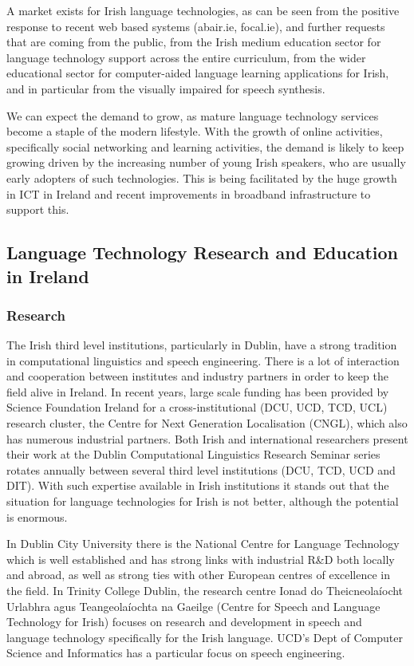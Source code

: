 \begin{multicols}{2}
A market exists for Irish language technologies, as can be seen from the positive response to recent web based systems (abair.ie, focal.ie), and further requests that are coming from the public, from the Irish medium education sector for language technology support across the entire curriculum,  from the wider educational sector for computer-aided language learning applications for Irish, and in particular from the visually impaired for speech synthesis. 

We can expect the demand to grow, as mature language technology services become a staple of the modern lifestyle. With the growth of online activities, specifically social networking and learning activities, the demand is likely to keep growing  driven by the increasing number  of young Irish speakers, who are usually early adopters of such technologies. This is being facilitated by the huge growth in ICT in Ireland and recent improvements in broadband infrastructure to support this.


\subsection{Language Technology Research and Education in Ireland}

\subsubsection{Research}

The Irish third level institutions, particularly in Dublin, have a strong tradition in computational linguistics and speech engineering. There is a lot of interaction and cooperation between institutes and industry partners in order to keep the field alive in Ireland. In recent years, large scale funding has been provided by Science Foundation Ireland for a cross-institutional (DCU, UCD, TCD, UCL) research cluster, the Centre for Next Generation Localisation (CNGL), which also has numerous industrial partners. Both Irish and international researchers present their work at the Dublin Computational Linguistics Research Seminar series rotates annually between several third level institutions (DCU, TCD, UCD and DIT). With such expertise available in Irish institutions it stands out that the situation for language technologies for Irish is not better, although the potential is enormous. 

In Dublin City University there is the National Centre for Language Technology which is well established and has strong links with industrial R\&D both locally and abroad, as well as strong ties with other European centres of excellence in the field. In Trinity College Dublin, the research centre Ionad do Theicneolaíocht Urlabhra agus Teangeolaíochta na Gaeilge (Centre for Speech and Language Technology for Irish) focuses on research and development in speech and language technology specifically for the Irish language. UCD’s Dept of Computer Science and Informatics has a particular focus on speech engineering.



\end{multicols}
